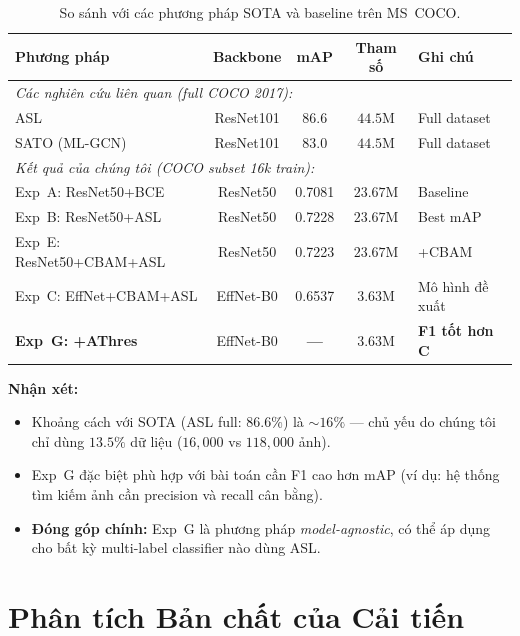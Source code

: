 \documentclass{article}
\begin{document}
\begin{table}[H]
  \caption{So sánh với các phương pháp SOTA và baseline trên MS~COCO.}
  \label{tab:comparison}
  \centering
  \small
  \begin{tabular}{lcccp{4cm}}
    \toprule
    \textbf{Phương pháp} & \textbf{Backbone} & \textbf{mAP} & \textbf{Tham số} & \textbf{Ghi chú} \\
    \midrule
    \multicolumn{5}{l}{\textit{Các nghiên cứu liên quan (full COCO 2017):}} \\
    ASL~\cite{ridnik2021asl}        & ResNet101  & 86.6 & $44.5\text{M}$ & Full dataset \\
    SATO (ML-GCN)~\cite{chen2019mlgcn} & ResNet101 & 83.0 & $44.5\text{M}$ & Full dataset \\
    \midrule
    \multicolumn{5}{l}{\textit{Kết quả của chúng tôi (COCO subset 16k train):}} \\
    Exp~A: ResNet50+BCE & ResNet50       & 0.7081 & $23.67\text{M}$ & Baseline \\
    Exp~B: ResNet50+ASL & ResNet50       & 0.7228 & $23.67\text{M}$ & Best mAP \\
    Exp~E: ResNet50+CBAM+ASL & ResNet50 & 0.7223 & $23.67\text{M}$ & +CBAM \\
    Exp~C: EffNet+CBAM+ASL & EffNet-B0  & 0.6537 & $3.63\text{M}$  & Mô hình đề xuất \\
    \textbf{Exp~G: +AThres} & EffNet-B0  & \textbf{---} & $3.63\text{M}$ & \textbf{F1 tốt hơn C} \\
    \bottomrule
  \end{tabular}
\end{table}

\textbf{Nhận xét:}
\begin{itemize}[leftmargin=1.8em]
  \item Khoảng cách với SOTA (ASL full: $86.6\%$) là $\sim16\%$ --- chủ yếu do
        chúng tôi chỉ dùng $13.5\%$ dữ liệu ($16{,}000$ vs $118{,}000$ ảnh).
  \item Exp~G đặc biệt phù hợp với bài toán cần F1 cao hơn mAP
        (ví dụ: hệ thống tìm kiếm ảnh cần precision và recall cân bằng).
  \item \textbf{Đóng góp chính:} Exp~G là phương pháp \textit{model-agnostic},
        có thể áp dụng cho bất kỳ multi-label classifier nào dùng ASL.
\end{itemize}

\section{Phân tích Bản chất của Cải tiến}
\end{document}
